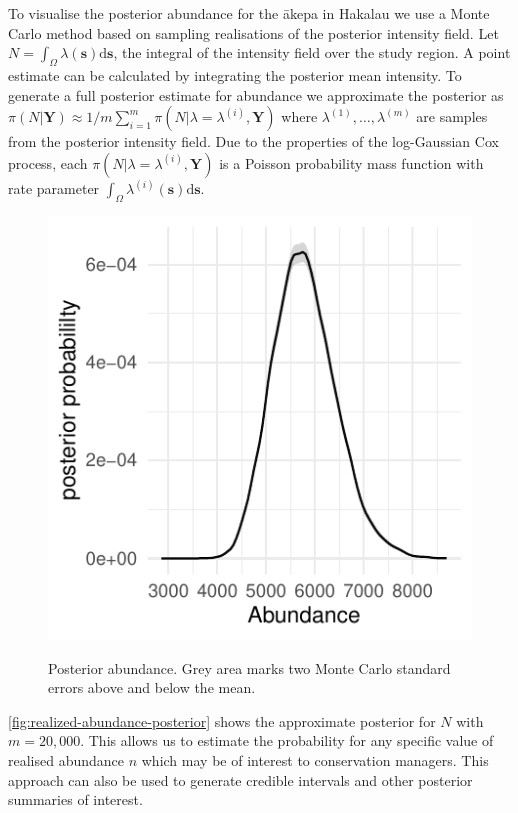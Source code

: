\documentclass{statsoc}
\newcommand{\bs}{\mathbf{s}}
\newcommand{\bm}{\boldsymbol}  %
\newcommand{\akepa}{\textquotesingle\={a}kepa}  %
\begin{document}
To visualise the posterior abundance for the \akepa{} in Hakalau we use a Monte Carlo method based on sampling realisations of the posterior intensity field.  Let $N = \int_{\Omega}\lambda(\bs)\mathrm{d}\bs$, the integral of the intensity field over the study region.  A point estimate can be calculated by integrating the posterior mean intensity. To generate a full posterior estimate for abundance we approximate the posterior as $\pi(N | \bm{Y}) \approx 1 / m \sum_{i=1}^m \pi (N | \lambda = \lambda^{(i)}, \bm{Y})$ where $\lambda^{(1)}, \ldots, \lambda^{(m)}$ are samples from the posterior intensity field. Due to the properties of the log-Gaussian Cox process, each $\pi(N | \lambda = \lambda^{(i)}, \bm{Y})$ is a Poisson probability mass function with rate parameter $\int_{\Omega}\lambda^{(i)}(\bs)\mathrm{d}\bs$. 
\begin{figure}[!htb]
	\begin{center}
		\includegraphics{figures/N_posterior.pdf}
		\caption{Posterior abundance.  Grey area marks two Monte Carlo standard errors above and below the mean.}
		\label{fig:realized-abundance-posterior}
	\end{center}
\end{figure}
\autoref{fig:realized-abundance-posterior} shows the approximate posterior for $N$ with $m = 20,000$.  This allows us to estimate the probability for any specific value of realised abundance $n$ which may be of interest to conservation managers.  This approach can also be used to generate credible intervals and other posterior summaries of interest. 
\end{document}
